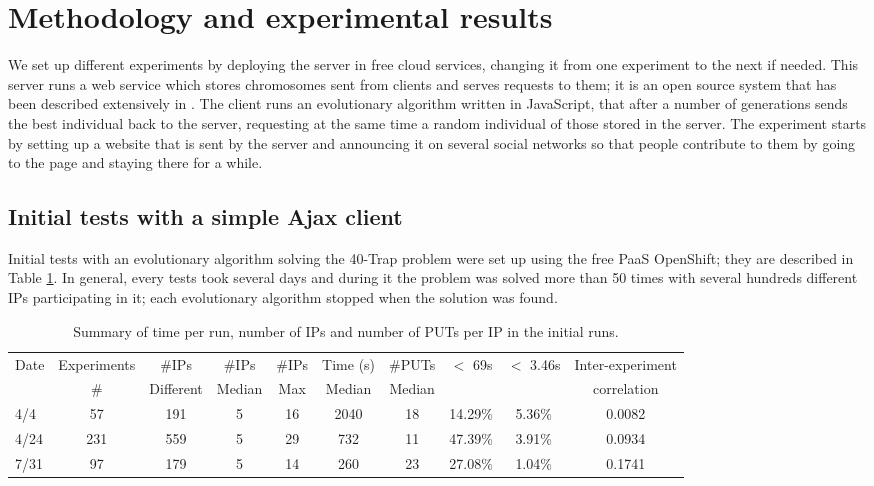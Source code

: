 \documentclass{sig-alternate}
\begin{document}
\section{Methodology and experimental results}
\label{sec:exp1}


We set up different experiments by deploying the server in free cloud
services, changing it from one experiment to the next if needed. This server runs a web service
which stores chromosomes sent from clients and serves requests to
them; it is 
an open source system that has been described extensively in
\cite{2016arXiv160101607Manom}. The client runs an evolutionary
algorithm written in JavaScript, that after a number of generations
sends the best individual back to the server, requesting at the same
time a random individual of those stored in the server. The experiment
starts by setting up a website that is sent by the server and announcing it on several social
networks so that people contribute to them by going to the page and
staying there for a while. 

\subsection{Initial tests with a simple Ajax client}


Initial tests with an evolutionary algorithm solving the 40-Trap
problem were set up using the free PaaS OpenShift; they are described in
Table \ref{tab:summary:os}. In general, every tests took several
days and during it the problem was solved more than 50 times with
several hundreds different IPs participating in it; each
evolutionary algorithm stopped when the solution was found. 
%
\begin{table}
\caption{Summary of time per run, number of IPs and number of PUTs per IP in the initial runs. \label{tab:summary:os}}
\begin{center}
\begin{tabular}{l|ccccccccc}
\hline
Date & Experiments &\#IPs &\#IPs &  \#IPs & Time (s) &  \#PUTs & $<$ 69s & $<$ 3.46s & Inter-experiment\\
     & \# & Different & Median & Max & Median &  Median & & & correlation \\ 
\hline
4/4 & 57 & 191 & 5 & 16 & 2040 & 18 & 14.29\% & 5.36\% & 0.0082 \\
4/24 & 231 & 559 & 5 & 29 & 732 & 11 & 47.39\% & 3.91\% & 0.0934\\
7/31 & 97 & 179 & 5 & 14 & 260 & 23 & 27.08\% & 1.04\%  & 0.1741\\
\hline
\end{tabular}
\end{center}
\end{table}
%
\end{document}
